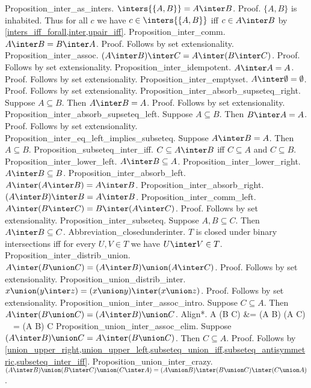 Proposition_inter_as_inters. $ \inters{ \{A,B \}} = A \inter B$.
Proof. $ \{A,B \}$ is inhabited. Thus for all $c$ we have $c \in \inters{ \{A,B \}}$ iff $c \in A \inter B$ by  \cref{inters_iff_forall,inter,upair_iff}. %
Proposition_inter_comm. $A \inter B = B \inter A$.
Proof. Follows by set extensionality.
Proposition_inter_assoc. $(A \inter B) \inter C = A \inter (B \inter C)$.
Proof. Follows by set extensionality.
Proposition_inter_idempotent. $A \inter A = A$.
Proof. Follows by set extensionality.
Proposition_inter_emptyset. $A \inter \emptyset =  \emptyset$.
Proof. Follows by set extensionality.
Proposition_inter_absorb_supseteq_right. Suppose $A \subseteq B$. Then $A \inter B = A$.
Proof. Follows by set extensionality.
Proposition_inter_absorb_supseteq_left. Suppose $A \subseteq B$. Then $B \inter A = A$.
Proof. Follows by set extensionality.
Proposition_inter_eq_left_implies_subseteq. Suppose $A \inter B = A$. Then $A \subseteq B$.
Proposition_subseteq_inter_iff. $C \subseteq A \inter B$ iff $C \subseteq A$ and $C \subseteq B$.
Proposition_inter_lower_left. $A \inter B  \subseteq A$.
Proposition_inter_lower_right. $A \inter B  \subseteq B$.
Proposition_inter_absorb_left. $A \inter (A \inter B) = A \inter B$.
Proposition_inter_absorb_right. $(A \inter B)  \inter B = A \inter B$.
Proposition_inter_comm_left. $A \inter (B \inter C) = B \inter (A \inter C)$.
Proof. Follows by set extensionality.
Proposition_inter_subseteq. Suppose $A,B \subseteq C$. Then $A \inter B \subseteq C$.
Abbreviation_closedunderinter. $T$ is closed under binary intersections iff for every $U,V \in T$ we have $U \inter V \in T$.
Proposition_inter_distrib_union. $A \inter (B \union C) = (A \inter B) \union (A \inter C)$.
Proof. Follows by set extensionality.
Proposition_union_distrib_inter. $x \union (y \inter z) = (x \union y) \inter (x \union z)$.
Proof. Follows by set extensionality.
Proposition_union_inter_assoc_intro. Suppose $C \subseteq A$. Then $A \inter (B \union C) = (A \inter B) \union C$.
Align*. A \inter (B \union C) &= (A \inter B) \union (A \inter C)   \ \ = (A \inter B) \union C  
Proposition_union_inter_assoc_elim. Suppose $(A \inter B) \union C = A \inter (B \union C)$. Then $C \subseteq A$.
Proof. Follows by  \cref{union_upper_right,union_upper_left,subseteq_union_iff,subseteq_antisymmetric,subseteq_inter_iff}.
Proposition_union_inter_crazy. $(A \inter B) \union (B \inter C) \union (C \inter A) = (A \union B) \inter (B \union C) \inter (C \union A)$.
